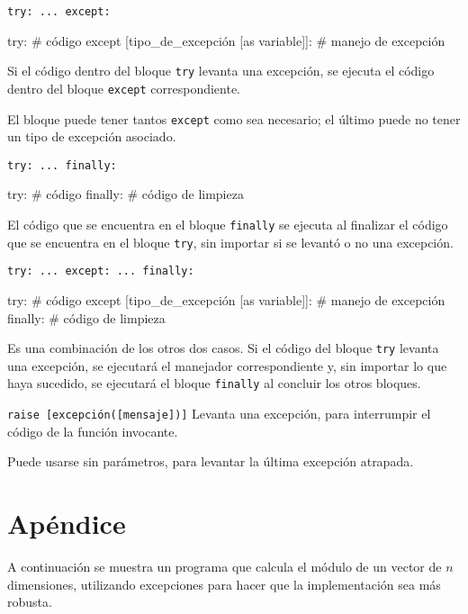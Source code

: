 \begin{referencia_python}

\begin{sintaxis}{\lstinline{try: ... except:}}
\begin{codigo-python-sn}
try:
    # código
except [tipo_de_excepción [as variable]]:
    # manejo de excepción
\end{codigo-python-sn}

Si el código dentro del bloque \lstinline!try! levanta una excepción, se
ejecuta el código dentro del bloque \lstinline!except! correspondiente.

El bloque puede tener tantos \lstinline!except! como sea necesario; el último
puede no tener un tipo de excepción asociado.
\end{sintaxis}

\begin{sintaxis}{\lstinline{try: ... finally:}}
\begin{codigo-python-sn}
try:
    # código
finally:
    # código de limpieza
\end{codigo-python-sn}

El código que se encuentra en el bloque \lstinline!finally! se ejecuta al
finalizar el código que se encuentra en el bloque \lstinline!try!, sin
importar si se levantó o no una excepción.
\end{sintaxis}

\begin{sintaxis}{\lstinline{try: ... except: ... finally:}}
\begin{codigo-python-sn}
try:
    # código
except [tipo_de_excepción [as variable]]:
    # manejo de excepción
finally:
    # código de limpieza
\end{codigo-python-sn}

Es una combinación de los otros dos casos.  Si el código del bloque
\lstinline!try! levanta una excepción, se ejecutará el manejador
correspondiente y, sin importar lo que haya sucedido, se ejecutará el
bloque \lstinline!finally! al concluir los otros bloques.
\end{sintaxis}

\begin{sintaxis}{\lstinline{raise [excepción([mensaje])]}}
Levanta una excepción, para interrumpir el código de la función invocante.

Puede usarse sin parámetros, para levantar la última excepción atrapada.
\end{sintaxis}

\end{referencia_python}

\section{Apéndice}
A continuación se muestra un programa que calcula el módulo de un vector de $n$
dimensiones, utilizando excepciones para hacer que la implementación sea más
robusta.


